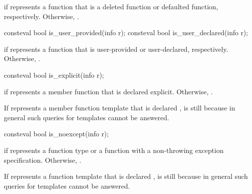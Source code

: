 \begin{itemdescr}
\pnum
\returns
{} if  represents a function that is
a deleted function
or defaulted function, respectively.
Otherwise, .
\end{itemdescr}

%
%
\begin{itemdecl}
consteval bool is_user_provided(info r);
consteval bool is_user_declared(info r);
\end{itemdecl}

\begin{itemdescr}
\pnum
\returns
{} if  represents a function that is
user-provided or user-declared, respectively.
Otherwise, .
\end{itemdescr}

%
\begin{itemdecl}
consteval bool is_explicit(info r);
\end{itemdecl}

\begin{itemdescr}
\pnum
\returns
 if  represents a member function that is declared explicit.
Otherwise, .
\begin{note}
If  represents a member function template that is declared ,
 is still 
because in general
such queries for templates cannot be answered.
\end{note}
\end{itemdescr}

%
\begin{itemdecl}
consteval bool is_noexcept(info r);
\end{itemdecl}

\begin{itemdescr}
\pnum
\returns
{} if  represents a  function type
or a function with a non-throwing exception specification.
Otherwise, .
\begin{note}
If  represents a function template that is declared ,
 is still 
because in general
such queries for templates cannot be answered.
\end{note}
\end{itemdescr}

